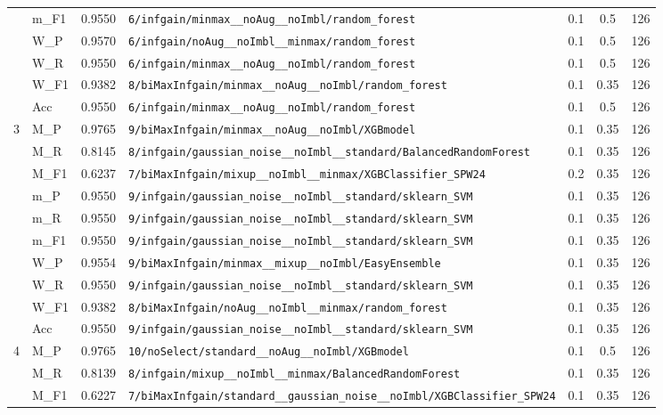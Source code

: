\begin{table}[htbp]
\begin{tabular}{|c|l|c|>{\ttfamily\footnotesize}p{7.2cm}|c|c|c|}
 & m\_F1 & 0.9550 & \texttt{6/infgain/minmax\_\_noAug\_\_noImbl/random\_forest} & 0.1 & 0.5  & 126 \\ 
 & W\_P & 0.9570 & \texttt{6/infgain/noAug\_\_noImbl\_\_minmax/random\_forest} & 0.1 & 0.5  & 126 \\ 
 & W\_R & 0.9550 & \texttt{6/infgain/minmax\_\_noAug\_\_noImbl/random\_forest} & 0.1 & 0.5  & 126 \\ 
 & W\_F1 & 0.9382 & \texttt{8/biMaxInfgain/minmax\_\_noAug\_\_noImbl/random\_forest} & 0.1 & 0.35  & 126 \\ 
 & Acc & 0.9550 & \texttt{6/infgain/minmax\_\_noAug\_\_noImbl/random\_forest} & 0.1 & 0.5  & 126 \\ 
\hline
\multirow{10}{*}{3} & M\_P & 0.9765 & \texttt{9/biMaxInfgain/minmax\_\_noAug\_\_noImbl/XGBmodel} & 0.1 & 0.35  & 126 \\ 
 & M\_R & 0.8145 & \texttt{8/infgain/gaussian\_noise\_\_noImbl\_\_standard/BalancedRandomForest} & 0.1 & 0.35  & 126 \\ 
 & M\_F1 & 0.6237 & \texttt{7/biMaxInfgain/mixup\_\_noImbl\_\_minmax/XGBClassifier\_SPW24} & 0.2 & 0.35  & 126 \\ 
 & m\_P & 0.9550 & \texttt{9/infgain/gaussian\_noise\_\_noImbl\_\_standard/sklearn\_SVM} & 0.1 & 0.35  & 126 \\ 
 & m\_R & 0.9550 & \texttt{9/infgain/gaussian\_noise\_\_noImbl\_\_standard/sklearn\_SVM} & 0.1 & 0.35  & 126 \\ 
 & m\_F1 & 0.9550 & \texttt{9/infgain/gaussian\_noise\_\_noImbl\_\_standard/sklearn\_SVM} & 0.1 & 0.35  & 126 \\ 
 & W\_P & 0.9554 & \texttt{9/biMaxInfgain/minmax\_\_mixup\_\_noImbl/EasyEnsemble} & 0.1 & 0.35  & 126 \\ 
 & W\_R & 0.9550 & \texttt{9/infgain/gaussian\_noise\_\_noImbl\_\_standard/sklearn\_SVM} & 0.1 & 0.35  & 126 \\ 
 & W\_F1 & 0.9382 & \texttt{8/biMaxInfgain/noAug\_\_noImbl\_\_minmax/random\_forest} & 0.1 & 0.35  & 126 \\ 
 & Acc & 0.9550 & \texttt{9/infgain/gaussian\_noise\_\_noImbl\_\_standard/sklearn\_SVM} & 0.1 & 0.35  & 126 \\ 
\hline
\multirow{10}{*}{4} & M\_P & 0.9765 & \texttt{10/noSelect/standard\_\_noAug\_\_noImbl/XGBmodel} & 0.1 & 0.5  & 126 \\ 
 & M\_R & 0.8139 & \texttt{8/infgain/mixup\_\_noImbl\_\_minmax/BalancedRandomForest} & 0.1 & 0.35  & 126 \\ 
 & M\_F1 & 0.6227 & \texttt{7/biMaxInfgain/standard\_\_gaussian\_noise\_\_noImbl/XGBClassifier\_SPW24} & 0.1 & 0.35  & 126 \\ 

\end{tabular}
\end{table}
